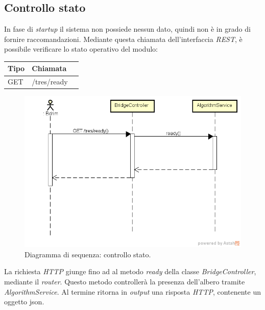 \subsection{Controllo stato}
In fase di \emph{startup} il sistema non possiede nessun dato, quindi non è in grado di fornire raccomandazioni. Mediante questa chiamata dell'interfaccia \emph{REST}, è possibile verificare lo stato operativo del modulo:\\
\def\arraystretch{1.5}
\begin{longtable}{|p{2.5cm}|p{5cm}|l|}
\hline
\textbf{Tipo} &	\textbf{Chiamata}	\\\hline
GET		&	/tres/ready		 \\\hline
\end{longtable}
\begin{figure}[h]
\centering
\includegraphics[scale=0.43]{immagini/DScheckstate}
\caption{Diagramma di sequenza: controllo stato.}
\label{fig:seq-controllostato}
\end{figure}
La richiesta \emph{HTTP} giunge fino ad al metodo \emph{ready} della classe \emph{BridgeController}, mediante il \emph{router}. Questo metodo controllerà la presenza dell'albero tramite \emph{AlgorithmService}. Al termine ritorna in \emph{output} una risposta \emph{HTTP}, contenente un oggetto \gls{json}.
\newpage
